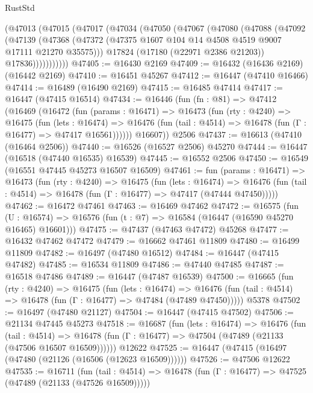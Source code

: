 \begin{lexlean}{RustStd}
\begin{coremodule}
{\begin{coremodule}
{{{{{{{{{{{{{{{{{{{{{{{{{{{{{{{{{{{{{{{{{{{{{{{{{{{{{{{      (@47013
        (@47015
          (@47017
            (@47034
              (@47050
                (@47067
                  (@47080
                    (@47088
                      (@47092
                        (@47139
                          (@47368
                            (@47372 (@47375 @1607 @104 @14 @4508 @4519 @9007 @17111 @21270 @35575)))
                          @17824
                          (@17180 (@22971 @2386 @21203))
                          @17836)))))))))))
@47405 := @16430 @2169
@47409 := @16432 (@16436 @2169) (@16442 @2169)
@47410 := @16451 @45267
@47412 := @16447 (@47410 @16466)
@47414 := @16489 (@16490 @2169)
@47415 := @16485 @47414
@47417 := @16447 (@47415 @16514)
@47434 := @16446
    (fun (fn : @81) =>
    @47412
      (@16469
        (@16472
          (fun (params : @16471) =>
          @16473
            (fun (rty : @4240) =>
            @16475
              (fun (lets : @16474) =>
              @16476 (fun (tail : @4514) => @16478 (fun (Γ : @16477) => @47417 @16561))))))
        @16607))
    @2506
@47437 := @16613 (@47410 (@16464 @2506))
@47440 := @16526 (@16527 @2506) @45270
@47444 := @16447 (@16518 (@47440 @16535) @16539)
@47445 := @16552 @2506
@47450 := @16549 (@16551 @47445 @45273 @16507 @16509)
@47461 := fun (params : @16471) =>
  @16473
    (fun (rty : @4240) =>
    @16475
      (fun (lets : @16474) =>
      @16476 (fun (tail : @4514) => @16478 (fun (Γ : @16477) => @47417 (@47444 @47450)))))
@47462 := @16472 @47461
@47463 := @16469 @47462
@47472 := @16575
    (fun (U : @16574) => @16576 (fun (t : @7) => @16584 (@16447 (@16590 @45270 @16465) @16601)))
@47475 := @47437 (@47463 @47472) @45268
@47477 := @16432 @47462 @47472
@47479 := @16662 @47461 @11809
@47480 := @16499 @11809
@47482 := @16497 (@47480 @16512)
@47484 := @16447 (@47415 @47482)
@47485 := @16534 @11809
@47486 := @47440 @47485
@47487 := @16518 @47486
@47489 := @16447 (@47487 @16539)
@47500 := @16665
    (fun (rty : @4240) =>
    @16475
      (fun (lets : @16474) =>
      @16476 (fun (tail : @4514) => @16478 (fun (Γ : @16477) => @47484 (@47489 @47450)))))
    @5378
@47502 := @16497 (@47480 @21127)
@47504 := @16447 (@47415 @47502)
@47506 := @21134 @47445 @45273
@47518 := @16687
    (fun (lets : @16474) =>
    @16476
      (fun (tail : @4514) =>
      @16478 (fun (Γ : @16477) => @47504 (@47489 (@21133 (@47506 @16507 @16509))))))
    @12622
@47525 := @16447 (@47415 (@16497 (@47480 (@21126 (@16506 (@12623 @16509))))))
@47526 := @47506 @12622
@47535 := @16711
    (fun (tail : @4514) => @16478 (fun (Γ : @16477) => @47525 (@47489 (@21133 (@47526 @16509)))))
}}}}}}}}}}}}}}}}}}}}}}}}}}}}}}}}}}}}}}}}}}}}}}}}}}}}}}}
\end{coremodule}}
\end{coremodule}
\end{lexlean}
